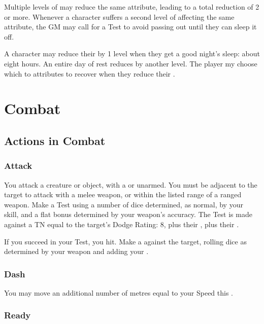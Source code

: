 Multiple levels of {\exhaustion} may reduce the same attribute, leading to a total reduction of 2 or more.
Whenever a character suffers a second level of {\exhaustion} affecting the same attribute, the GM may call for a Test to avoid passing out until they can sleep it off.

A character may reduce their {\exhaustion} by 1 level when they get a good night's sleep: about eight hours.
An entire day of rest reduces {\exhaustion} by another level.
The player my choose which to attributes to recover when they reduce their {\exhaustion}.

\section{Combat}

\subsection{Actions in Combat}

\subsubsection{Attack}

You attack a creature or object, with a  or unarmed.
You must be adjacent to the target to attack with a melee weapon, or within the listed range of a ranged weapon.
Make a Test using a number of dice determined, as normal, by your  skill, and a flat bonus determined by your weapon's accuracy.
The Test is made against a TN equal to the target's Dodge Rating: 8, plus their , plus their .

If you succeed in your Test, you hit.
Make a  against the target, rolling dice as determined by your weapon and adding your .

\subsubsection{Dash}

You may move an additional number of metres equal to your Speed this {\turn}.

\subsubsection{Ready}

